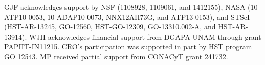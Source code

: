 \documentclass[debug, preprint, twocolumn]{rmaa}
\begin{document}
\acknowledgments

GJF acknowledges support by NSF (1108928, 1109061, and 1412155), NASA (10-ATP10-0053, 10-ADAP10-0073, NNX12AH73G, and ATP13-0153), and STScI (HST-AR-13245, GO-12560, HST-GO-12309, GO-13310.002-A, and HST-AR-13914).
WJH acknowledges financial support from DGAPA-UNAM through grant PAPIIT-IN11215.
CRO's participation was supported in part by HST program GO 12543.
MP received partial support from CONACyT grant 241732.

\clearpage

\end{document}
